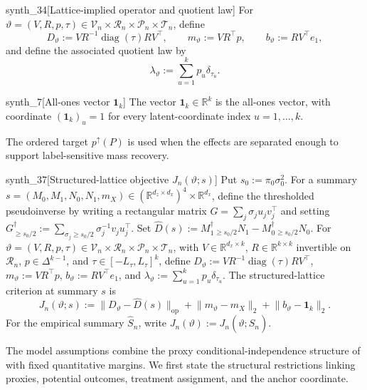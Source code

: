 \begin{definitionv}{synth_34}[Lattice-implied operator and quotient law]
For \(\vartheta=(V,R,p,\tau)\in\mathcal V_n\times\mathcal R_n\times\mathcal P_n\times\mathcal T_n\), define \[D_\vartheta:=VR^{-1}\operatorname{diag}(\tau)RV^\top,\qquad m_\vartheta:=VR^\top p,\qquad b_\vartheta:=RV^\top e_1,\] and define the associated quotient law by \[\lambda_\vartheta:=\sum_{u=1}^k p_u\delta_{\tau_u}.\]
\end{definitionv}

\begin{definitionv}{synth_7}[All-ones vector $\mathbf 1_k$]
The vector $\mathbf 1_k\in\mathbb R^k$ is the all-ones vector, with coordinate $(\mathbf 1_k)_u=1$ for every latent-coordinate index $u=1,\ldots,k$.
\end{definitionv}

The ordered target \(p^{\uparrow}(P)\) is used when the effects are separated enough to support label-sensitive mass recovery.

\begin{definitionv}{synth_37}[Structured-lattice objective $J_n(\vartheta;s)$]
Put $s_0:=\pi_0\sigma_0^2$. For a summary $s=(M_0,M_1,N_0,N_1,m_X)\in(\mathbb R^{d_z\times d_x})^4\times\mathbb R^{d_x}$, define the thresholded pseudoinverse by writing a rectangular matrix $G=\sum_j\sigma_j u_jv_j^\top$ and setting $G^\dagger_{\ge s_0/2}:=\sum_{\sigma_j\ge s_0/2}\sigma_j^{-1}v_ju_j^\top$. Set $\widehat D(s):=M_1^\dagger{}_{\ge s_0/2}N_1-M_0^\dagger{}_{\ge s_0/2}N_0$. For $\vartheta=(V,R,p,\tau)\in\mathcal V_n\times\mathcal R_n\times\mathcal P_n\times\mathcal T_n$, with $V\in\mathbb R^{d_x\times k}$, $R\in\mathbb R^{k\times k}$ invertible on $\mathcal R_n$, $p\in\Delta^{k-1}$, and $\tau\in[-L_\tau,L_\tau]^k$, define $D_\vartheta:=VR^{-1}\operatorname{diag}(\tau)RV^\top$, $m_\vartheta:=VR^\top p$, $b_\vartheta:=RV^\top e_1$, and $\lambda_\vartheta:=\sum_{u=1}^kp_u\delta_{\tau_u}$. The structured-lattice criterion at summary $s$ is 
\[
J_n(\vartheta;s):=\lVert D_\vartheta-\widehat D(s)\rVert_{\mathrm{op}}+\lVert m_\vartheta-m_X\rVert_2+\lVert b_\vartheta-\mathbf 1_k\rVert_2.
\]
For the empirical summary $\widehat S_n$, write $J_n(\vartheta):=J_n(\vartheta;\widehat S_n)$.
\end{definitionv}

The model assumptions combine the proxy conditional-independence structure of \citet{VirkMazaheriWu2026} with fixed quantitative margins. We first state the structural restrictions linking proxies, potential outcomes, treatment assignment, and the anchor coordinate.

